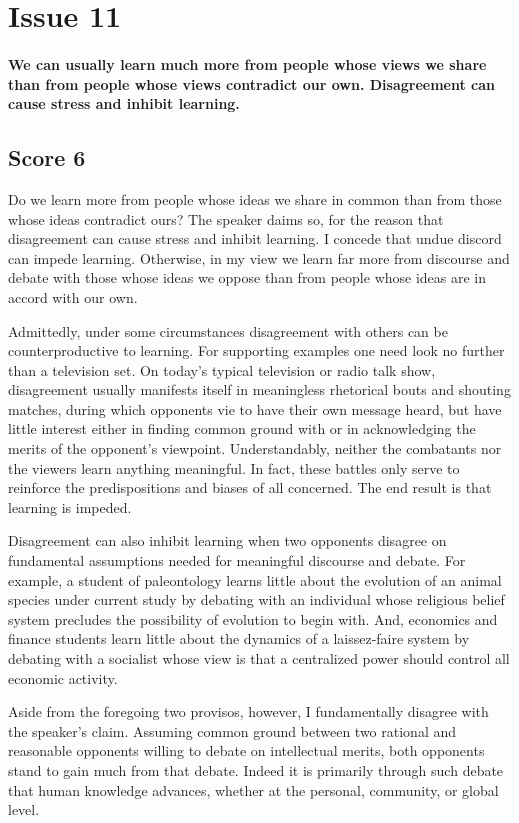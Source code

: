 \section{Issue 11}

\paragraph{We can usually learn much more from people whose views we share than from people whose views contradict our own.
Disagreement can cause stress and inhibit learning.}

\subsection{Score 6}
Do we learn more from people whose ideas we share in common than from those whose ideas contradict ours?
The speaker daims so, for the reason that disagreement can cause stress and inhibit learning.
I concede that undue discord can impede learning.
Otherwise, in my view we learn far more from discourse and debate with those whose ideas we oppose than from people whose ideas are in accord with our own.

Admittedly, under some circumstances disagreement with others can be counterproductive to learning.
For supporting examples one need look no further than a television set.
On today's typical television or radio talk show, disagreement usually manifests itself in meaningless
rhetorical bouts and shouting matches, during which opponents vie to have their own message heard, but have little interest either in finding common ground with or in acknowledging the merits of the opponent's viewpoint. 
Understandably, neither the combatants nor the viewers learn anything meaningful.
In fact, these battles only serve to reinforce the predispositions and biases of all concerned.
The end result is that learning is impeded.

Disagreement can also inhibit learning when two opponents disagree on fundamental assumptions needed for meaningful discourse and debate.
For example, a student of paleontology learns little about the evolution of an animal species under current study by debating with an individual whose religious belief system precludes the possibility of evolution
to begin with.
And, economics and finance students learn little about the dynamics of a laissez-faire system by debating with a socialist whose view is that a centralized power should
control all economic activity.

Aside from the foregoing two provisos, however, I fundamentally disagree with the speaker's claim.
Assuming common ground between two rational and reasonable opponents willing to debate on intellectual merits, both opponents stand to gain much from that debate.
Indeed it is primarily through such debate that human knowledge advances, whether at the personal, community, or global level.

